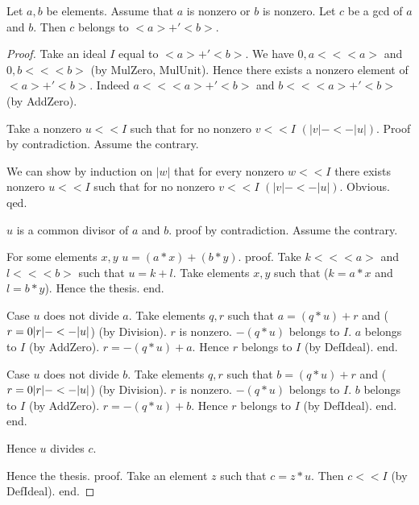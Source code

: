 \documentclass{document}
\begin{document}
\begin{forthel}
  \begin{theorem}[GCDin]
    Let $a,b$ be elements. Assume that $a$ is nonzero or $b$ is nonzero. Let $c$ be a gcd of $a$ and $b$. Then $c$ belongs to $<a> +' <b>$.
  \end{theorem}
  \begin{proof}
    Take an ideal $I$ equal to $<a> +' <b>$. We have $0,a << <a>$ and $0,b << <b>$ (by MulZero, MulUnit). Hence there exists a nonzero element of $<a> +' <b>$. Indeed $a << <a> +' <b>$ and $b << <a> +' <b>$ (by AddZero).

    Take a nonzero $u << I$ such that for no nonzero $v << I$ $(|v| -<- |u|)$.
    Proof by contradiction.
      Assume the contrary.

      We can show by induction on $|w|$ that for every nonzero $w << I$ there
        exists nonzero $u << I$ such that for no nonzero $v << I$ $(|v| -<- |u|)$.
      Obvious.
    qed.

    $u$ is a common divisor of $a$ and $b$.
    proof by contradiction.
      Assume the contrary.

      For some elements $x,y$ $u = (a * x) + (b * y)$.
      proof.
        Take $k << <a>$ and $l << <b>$ such that $u = k + l$. Take elements $x,y$ such that ($k = a * x$ and $l = b * y$). Hence the thesis.
      end.

      Case $u$ does not divide $a$.
        Take elements $q,r$ such that $a = (q * u) + r$ and ($r = 0 \/ |r| -<- |u|$) (by Division). $r$ is nonzero. $- (q * u)$ belongs to $I$. $a$ belongs to $I$ (by AddZero). $r = - (q * u) + a$. Hence $r$ belongs to $I$ (by DefIdeal).
      end.

      Case $u$ does not divide $b$.
        Take elements $q,r$ such that $b = (q * u) + r$ and ($r = 0 \/ |r| -<- |u|$) (by Division). $r$ is nonzero. $- (q * u)$ belongs to $I$. $b$ belongs to $I$ (by AddZero). $r = - (q * u) + b$. Hence $r$ belongs to $I$ (by DefIdeal).
      end.
    end.

    Hence $u$ divides $c$.

    Hence the thesis.
    proof.
      Take an element $z$ such that $c = z * u$. Then $c << I$ (by DefIdeal).
    end.
  \end{proof}
\end{forthel}
\end{document}
